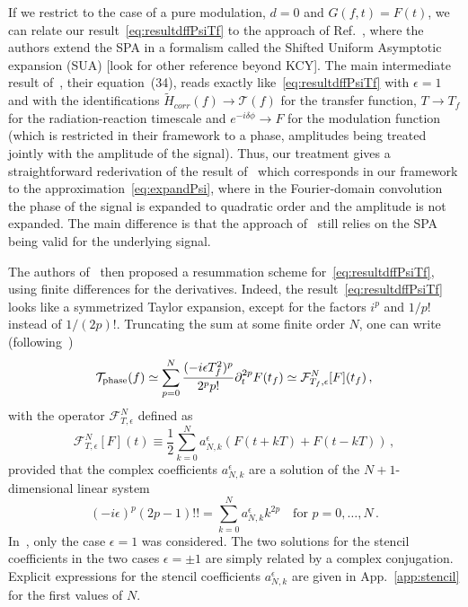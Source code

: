 \documentclass[aps,showpacs,twocolumn,
prd,superscriptaddress,nofootinbib]{revtex4-1}
\newcommand{\be}{\begin{equation}}
\newcommand{\ee}{\end{equation}}
\newcommand\calF{{\mathcal{F}}}
\newcommand\calT{{\mathcal{T}}}
\newcommand{\tf}{t_{f}}
\newcommand{\Tf}{T_{f}}
\newcommand{\SM}[1]{{\color{Red} #1}}
\begin{document}
If we restrict to the case of a pure modulation, $d=0$ and $G(f,t) = F(t)$, we can relate our result~\eqref{eq:resultdffPsiTf} to the approach of Ref.~\cite{KCY14}, where the authors extend the SPA in a formalism called the Shifted Uniform Asymptotic expansion (SUA) \SM{[look for other reference beyond KCY]}.
The main intermediate result of~\cite{KCY14}, their equation~(34), reads exactly like~\eqref{eq:resultdffPsiTf} with $\epsilon=1$ and with the identifications $\tilde{H}_{corr}(f)\rightarrow \calT(f)$ for the transfer function, $T\rightarrow \Tf$ for the radiation-reaction timescale and $e^{-i\delta\phi} \rightarrow F$ for the modulation function (which is restricted in their framework to a phase, amplitudes being treated jointly with the amplitude of the signal). Thus, our treatment gives a straightforward rederivation of the result of~\cite{KCY14} which corresponds in our framework to the approximation~\eqref{eq:expandPsi}, where in the Fourier-domain convolution the phase of the signal is expanded to quadratic order and the amplitude is not expanded. The main difference is that the approach of~\cite{KCY14} still relies on the SPA being valid for the underlying signal.

The authors of~\cite{KCY14} then proposed a resummation scheme for~\eqref{eq:resultdffPsiTf}, using finite differences for the derivatives. Indeed, the result~\eqref{eq:resultdffPsiTf} looks like a symmetrized Taylor expansion, except for the factors $i^{p}$ and $1/p!$ instead of $1/(2p)!$. Truncating the sum at some finite order $N$, one can write (following~\cite{KCY14})
\be\label{eq:stencilresult}
	\calT_{\rm phase}(f) \simeq \sum\limits_{p = 0}^{N} \frac{(-i\epsilon\Tf^{2})^{p}}{2^{p}p!} \partial_{t}^{2p}F(\tf) \simeq \calF^{N}_{\Tf, \epsilon}[F] (\tf) \,,
\ee
with the operator $\calF_{T, \epsilon}^{N}$ defined as
\be\label{eq:stencilfresnel}
	\calF_{T, \epsilon}^{N}[F] (t) \equiv \frac{1}{2}\sum\limits_{k=0}^{N} a_{N,k}^{\epsilon} \left( F(t + kT) + F(t - k T) \right) \,,
\ee
provided that the complex coefficients $a_{N,k}^{\epsilon}$ are a solution of the $N+1$-dimensional linear system~\cite{KCY14}
\be\label{eq:stencilsystem}
	(-i\epsilon)^{p} (2p-1)!! = \sum\limits_{k=0}^{N} a_{N,k}^{\epsilon} k^{2p} \quad \text{for } p=0,\dots,N \,.
\ee
In~\cite{KCY14}, only the case $\epsilon=1$ was considered. The two solutions for the stencil coefficients in the two cases $\epsilon = \pm 1$ are simply related by a complex conjugation. Explicit expressions for the stencil coefficients $a_{N,k}^{\epsilon}$ are given in App.~\ref{app:stencil} for the first values of $N$.
\end{document}
